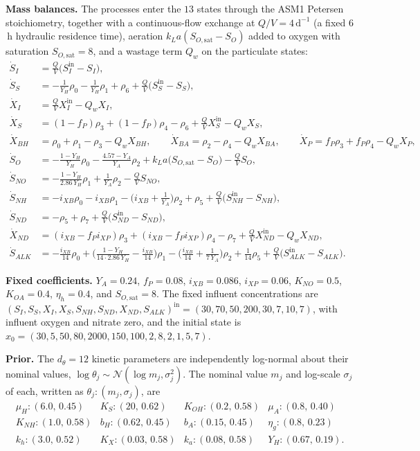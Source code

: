 \textbf{Mass balances.} The processes enter the $13$ states through the ASM1 Petersen
stoichiometry, together with a continuous-flow exchange at $Q/V=4\,\mathrm{d}^{-1}$ (a
fixed $6$\,h hydraulic residence time), aeration $k_La(S_{O,\mathrm{sat}}-S_O)$ added to
oxygen with saturation $S_{O,\mathrm{sat}}=8$, and a wastage term $Q_w$ on the
particulate states:
\begin{align*}
\dot S_I &= \tfrac{Q}{V}\big(S_I^{\mathrm{in}}-S_I\big),\\
\dot S_S &= -\tfrac{1}{Y_H}\rho_0-\tfrac{1}{Y_H}\rho_1+\rho_6+\tfrac{Q}{V}\big(S_S^{\mathrm{in}}-S_S\big),\\
\dot X_I &= \tfrac{Q}{V}X_I^{\mathrm{in}}-Q_w X_I,\\
\dot X_S &= (1-f_P)\rho_3+(1-f_P)\rho_4-\rho_6+\tfrac{Q}{V}X_S^{\mathrm{in}}-Q_w X_S,\\
\dot X_{BH} &= \rho_0+\rho_1-\rho_3-Q_w X_{BH},\qquad
\dot X_{BA} = \rho_2-\rho_4-Q_w X_{BA},\qquad
\dot X_P = f_P\rho_3+f_P\rho_4-Q_w X_P,\\
\dot S_O &= -\tfrac{1-Y_H}{Y_H}\rho_0-\tfrac{4.57-Y_A}{Y_A}\rho_2+k_La\big(S_{O,\mathrm{sat}}-S_O\big)-\tfrac{Q}{V}S_O,\\
\dot S_{NO} &= -\tfrac{1-Y_H}{2.86\,Y_H}\rho_1+\tfrac{1}{Y_A}\rho_2-\tfrac{Q}{V}S_{NO},\\
\dot S_{NH} &= -i_{XB}\rho_0-i_{XB}\rho_1-\big(i_{XB}+\tfrac{1}{Y_A}\big)\rho_2+\rho_5+\tfrac{Q}{V}\big(S_{NH}^{\mathrm{in}}-S_{NH}\big),\\
\dot S_{ND} &= -\rho_5+\rho_7+\tfrac{Q}{V}\big(S_{ND}^{\mathrm{in}}-S_{ND}\big),\\
\dot X_{ND} &= (i_{XB}-f_P i_{XP})\rho_3+(i_{XB}-f_P i_{XP})\rho_4-\rho_7+\tfrac{Q}{V}X_{ND}^{\mathrm{in}}-Q_w X_{ND},\\
\dot S_{ALK} &= -\tfrac{i_{XB}}{14}\rho_0+\Big(\tfrac{1-Y_H}{14\cdot2.86\,Y_H}-\tfrac{i_{XB}}{14}\Big)\rho_1-\big(\tfrac{i_{XB}}{14}+\tfrac{1}{7\,Y_A}\big)\rho_2+\tfrac{1}{14}\rho_5+\tfrac{Q}{V}\big(S_{ALK}^{\mathrm{in}}-S_{ALK}\big).
\end{align*}

\textbf{Fixed coefficients.} $Y_A=0.24$, $f_P=0.08$, $i_{XB}=0.086$, $i_{XP}=0.06$,
$K_{NO}=0.5$, $K_{OA}=0.4$, $\eta_h=0.4$, and $S_{O,\mathrm{sat}}=8$. The fixed influent
concentrations are $(S_I,S_S,X_I,X_S,S_{NH},S_{ND},X_{ND},S_{ALK})^{\mathrm{in}}=
(30,70,50,200,30,7,10,7)$, with influent oxygen and nitrate zero, and the initial state
is $x_0=(30,5,50,80,2000,150,100,2,8,2,1,5,7)$.

\textbf{Prior.} The $d_\theta=12$ kinetic parameters are independently log-normal about
their nominal values, $\log\theta_j\sim\mathcal N(\log m_j,\sigma_j^2)$. The nominal value
$m_j$ and log-scale $\sigma_j$ of each, written as $\theta_j:(m_j,\sigma_j)$, are
\[
\begin{array}{llll}
\mu_H:(6.0,\,0.45) & K_S:(20,\,0.62) & K_{OH}:(0.2,\,0.58) & \mu_A:(0.8,\,0.40)\\[2pt]
K_{NH}:(1.0,\,0.58) & b_H:(0.62,\,0.45) & b_A:(0.15,\,0.45) & \eta_g:(0.8,\,0.23)\\[2pt]
k_h:(3.0,\,0.52) & K_X:(0.03,\,0.58) & k_a:(0.08,\,0.58) & Y_H:(0.67,\,0.19).
\end{array}
\]


